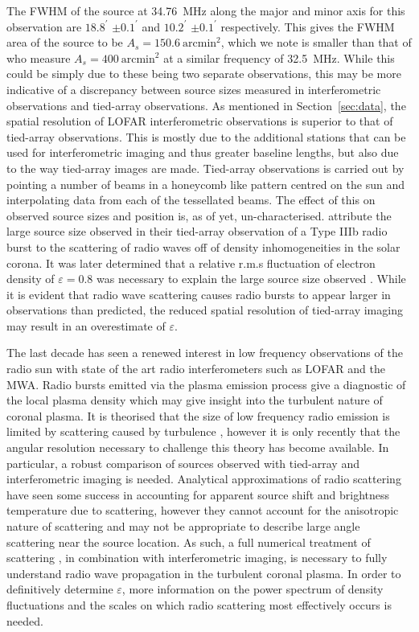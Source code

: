 The FWHM of the source at 34.76~MHz along the major and minor axis for this observation are $18.8^\prime$ $\pm 0.1^\prime$ and $10.2^\prime$ $\pm 0.1^\prime$ respectively. This gives the FWHM area of the source to be $A_s = 150.6~\mbox{arcmin}^2$, which we note is smaller than that of \cite{Kontar2017} who measure $A_s = 400~\mbox{arcmin}^2$ at a similar frequency of 32.5~MHz. While this could be simply due to these being two separate observations, this may be more indicative of a discrepancy between source sizes measured in interferometric observations and tied-array observations.
As mentioned in Section~\ref{sec:data}, the spatial resolution of LOFAR interferometric observations is superior to that of tied-array observations. This is mostly due to the additional stations that can be used for interferometric imaging and thus greater baseline lengths, but also due to the way tied-array images are made. Tied-array observations is carried out by pointing a number of beams in a honeycomb like pattern centred on the sun and interpolating data from each of the tessellated beams. The effect of this on observed source sizes and position is, as of yet, un-characterised. \cite{Kontar2017} attribute the large source size observed in their tied-array observation of a Type IIIb radio burst to the scattering of radio waves off of density inhomogeneities in the solar corona. It was later determined that a relative r.m.s fluctuation of electron density of $\varepsilon = 0.8$ was necessary to explain the large source size observed \cite{Kontar2019}. While it is evident that radio wave scattering causes radio bursts to appear larger in observations than predicted, the reduced spatial resolution of tied-array imaging may result in an overestimate of $\varepsilon$.

The last decade has seen a renewed interest in low frequency observations of the radio sun with state of the art radio interferometers such as LOFAR and the MWA. Radio bursts emitted via the plasma emission process give a diagnostic of the local plasma density which may give insight into the turbulent nature of coronal plasma. It is theorised that the size of low frequency radio emission is limited by scattering caused by turbulence \citep{Bastian1994}, however it is only recently that the angular resolution necessary to challenge this theory has become available. In particular, a robust comparison of sources observed with tied-array and interferometric imaging is needed. Analytical approximations of radio scattering \citep[e.g.][]{Chrysaphi2018,Gordovskyy2019,Sharma2020} have seen some success in accounting for apparent source shift and brightness temperature due to scattering, however they cannot account for the anisotropic nature of scattering and may not be appropriate to describe large angle scattering near the source location. As such, a full numerical treatment of scattering \citep[e.g.][]{Thejappa2008, Bian2019, Kontar2019}, in combination with interferometric imaging, is necessary to fully understand radio wave propagation in the turbulent coronal plasma. In order to definitively determine $\varepsilon$, more information on the power spectrum of density fluctuations and the scales on which radio scattering most effectively occurs is needed.

